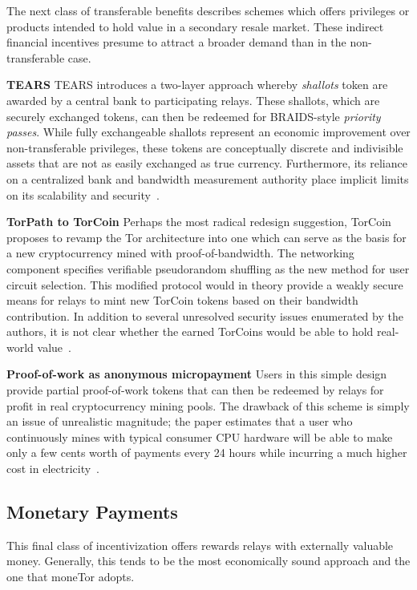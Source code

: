 The next class of transferable benefits describes schemes which offers
privileges or products intended to hold value in a secondary resale market. These
indirect financial incentives presume to attract a broader demand than in the
non-transferable case.

\textbf{TEARS} TEARS introduces a two-layer approach whereby \emph{shallots}
token are awarded by a central bank to participating relays. These shallots,
which are securely exchanged tokens, can then be redeemed for BRAIDS-style
\emph{priority passes}. While fully exchangeable shallots represent an economic
improvement over non-transferable privileges, these tokens are conceptually
discrete and indivisible assets that are not as easily exchanged as true
currency. Furthermore, its reliance on a centralized bank and bandwidth
measurement authority place implicit limits on its scalability and
security~\cite{jansen2010recruiting}.

\textbf{TorPath to TorCoin} Perhaps the most radical redesign suggestion,
TorCoin proposes to revamp the Tor architecture into one which can serve as the
basis for a new cryptocurrency mined with proof-of-bandwidth. The networking
component specifies verifiable pseudorandom shuffling as the new method for user
circuit selection. This modified protocol would in theory provide a weakly
secure means for relays to mint new TorCoin tokens based on their bandwidth
contribution. In addition to several unresolved security issues enumerated by
the authors, it is not clear whether the earned TorCoins would be able to hold
real-world value~\cite{ghosh2014torpath}.

\textbf{Proof-of-work as anonymous micropayment} Users in this simple design
provide partial proof-of-work tokens that can then be redeemed by relays for
profit in real cryptocurrency mining pools. The drawback of this scheme is
simply an issue of unrealistic magnitude; the paper estimates that a user who
continuously mines with typical consumer CPU hardware will be able to make only
a few cents worth of payments every 24 hours while incurring a much higher cost
in electricity~\cite{biryukov2015proof}.

\subsection{Monetary Payments}
\label{sub:monetary}

This final class of incentivization offers rewards relays with externally
valuable money. Generally, this tends to be the most economically
sound approach and the one that moneTor adopts.

